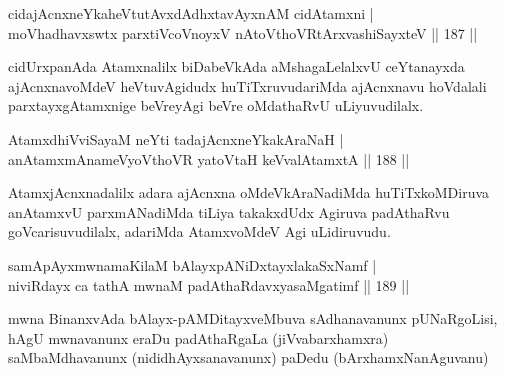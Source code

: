 \begin{shl}
cidajAcnxneYkaheVtutAvxdAdhxtavAyxnAM cidAtamxni |\\
moVhadhavxswtx parxtiVcoV\s noyxV nAtoV\s thoVR\s tArxvashiSayxteV \hfill || 187 ||
\end{shl}

\begin{artha}
cidUrxpanAda Atamxnalilx biDabeVkAda aMshagaLelalxvU ceYtanayxda ajAcnxnavoMdeV heVtuvAgidudx huTiTxruvudariMda ajAcnxnavu hoVdalali parxtayxgAtamxnige beVreyAgi beVre oMdathaRvU uLiyuvudilalx.
\end{artha}


\begin{shl}
AtamxdhiVviSayaM neYti tadajAcnxneYkakAraNaH |\\
anAtamxmAnameVyoV\s thoVR yatoV\s taH keVvalAtamxtA \hfill || 188 ||
\end{shl}

\begin{artha}
AtamxjAcnxnadalilx adara ajAcnxna oMdeVkAraNadiMda huTiTxkoMDiruva anAtamxvU parxmANadiMda tiLiya takakxdUdx Agiruva padAthaRvu goVcarisuvudilalx, adariMda AtamxvoMdeV Agi uLidiruvudu.
\end{artha}





\begin{shl}
samApAyxmwnamaKilaM bAlayxpANiDxtayxlakaSxNamf |\\
niviRdayx ca tathA mwnaM padAthaRdavxyasaMgatimf \hfill || 189 ||
\end{shl}

\begin{artha}%
mwna BinanxvAda bAlayx-pAMDitayxveMbuva sAdhanavanunx pUNaRgoLisi, hAgU mwnavanunx eraDu padAthaRgaLa (jiVvabarxhamxra) saMbaMdhavanunx (nididhAyxsanavanunx) paDedu (bArxhamxNanAguvanu)
\end{artha}


